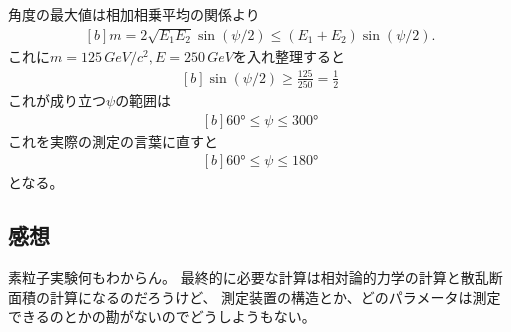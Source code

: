 \documentclass[../../master.tex]{subfiles}
\begin{document}
\subsection{}
角度の最大値は相加相乗平均の関係より
\begin{equation}\begin{aligned}[b]
    m = 2\sqrt{E_1E_2}\sin(\psi/2) \le (E_1+E_2)\sin(\psi/2).
\end{aligned}\end{equation}
これに\(m=125\,\si{GeV/c^2}, E=250\,{\si{GeV}}\)を入れ整理すると
\begin{equation}\begin{aligned}[b]
    \sin(\psi/2) \ge \frac{125}{250} = \frac{1}{2}
\end{aligned}\end{equation}
これが成り立つ\(\psi\)の範囲は
\begin{equation}\begin{aligned}[b]
    \ang{60}\le \psi \le \ang{300}
\end{aligned}\end{equation}
これを実際の測定の言葉に直すと
\begin{equation}\begin{aligned}[b]
    \ang{60}\le \psi \le \ang{180}
\end{aligned}\end{equation}
となる。

\subsection*{感想}
素粒子実験何もわからん。
最終的に必要な計算は相対論的力学の計算と散乱断面積の計算になるのだろうけど、
測定装置の構造とか、どのパラメータは測定できるのとかの勘がないのでどうしようもない。
\end{document}
